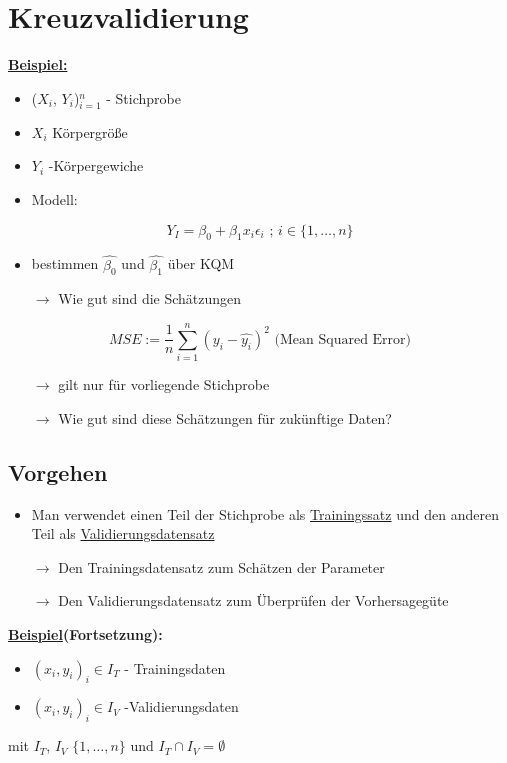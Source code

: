 \section{Kreuzvalidierung}
\textbf{\underline{Beispiel:}}
	\begin{itemize}
		\item ($X_i$, $Y_i$)$_{i=1}^n$ - Stichprobe
		\item $X_i$ Körpergröße
		\item $Y_i$ -Körpergewiche
		\item Modell: 
	\end{itemize}
		\[Y_I = \beta_0 + \beta_1 x_i\epsilon_i \text{ ; } i \in \{1, \ldots,n\}\]
\begin{itemize}
\item bestimmen $\hat{\beta_0}$ und $\hat{\beta_1}$ über KQM
\item [\(\rightarrow\)] Wie gut sind die Schätzungen
\end{itemize}


\[ MSE := \frac{1}{n} \sum_{i = 1}^{n} (y_i - \hat{y_i})^2 \text{  (Mean Squared Error)}\]

\begin{itemize}
	\item[\( \rightarrow \)] gilt nur für vorliegende Stichprobe
	\item[\( \rightarrow \)] Wie gut sind diese Schätzungen für zukünftige Daten?
\end{itemize}

\subsection{Vorgehen}
\begin{itemize}
	\item Man verwendet einen Teil der Stichprobe als \underline{Trainingssatz} und den anderen Teil als \underline{Validierungsdatensatz}
	\item[\( \rightarrow \)] Den Trainingsdatensatz zum Schätzen der Parameter
	\item[\( \rightarrow \)] Den Validierungsdatensatz zum Überprüfen der Vorhersagegüte
\end{itemize}

\textbf{\underline{Beispiel}(Fortsetzung):}
\begin{itemize}
	\item $(x_i, y_i)_i \in I_T$ - Trainingsdaten
	\item $(x_i,y_i)_i \in I_V$ -Validierungsdaten
\end{itemize}
mit $ I_T $, $ I_V $   $\{1,\ldots,n\}$   und $I_T \cap I_V = \emptyset$
	
